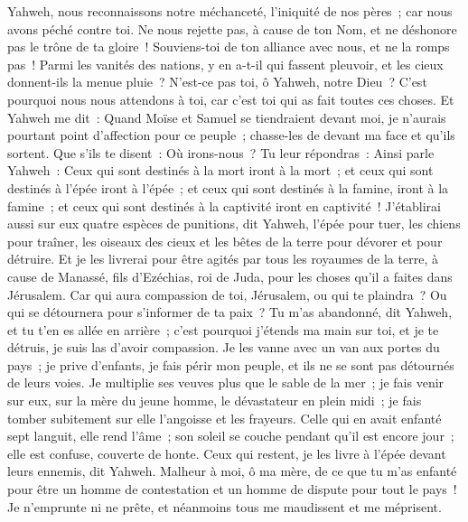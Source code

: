 \begin{multicols}{2}
Yahweh, nous reconnaissons notre méchanceté, l'iniquité de nos pères~; car nous avons péché contre toi.
Ne nous rejette pas, à cause de ton Nom, et ne déshonore pas le trône de ta gloire~! Souviens-toi de ton alliance avec nous, et ne la romps pas~!
Parmi les vanités des nations, y en a-t-il qui fassent pleuvoir, et les cieux donnent-ils la menue pluie~? N'est-ce pas toi, ô Yahweh, notre Dieu~? C'est pourquoi nous nous attendons à toi, car c'est toi qui as fait toutes ces choses.
\VerseOne{}Et Yahweh me dit~: Quand Moïse et Samuel se tiendraient devant moi, je n'aurais pourtant point d'affection pour ce peuple~; chasse-les de devant ma face et qu'ils sortent.
Que s'ils te disent~: Où irons-nous~? Tu leur répondras~: Ainsi parle Yahweh~: Ceux qui sont destinés à la mort iront à la mort~; et ceux qui sont destinés à l'épée iront à l'épée~; et ceux qui sont destinés à la famine, iront à la famine~; et ceux qui sont destinés à la captivité iront en captivité~!
J'établirai aussi sur eux quatre espèces de punitions, dit Yahweh, l'épée pour tuer, les chiens pour traîner, les oiseaux des cieux et les bêtes de la terre pour dévorer et pour détruire. 
Et je les livrerai pour être agités par tous les royaumes de la terre, à cause de Manassé, fils d'Ezéchias, roi de Juda, pour les choses qu'il a faites dans Jérusalem. 
Car qui aura compassion de toi, Jérusalem, ou qui te plaindra~? Ou qui se détournera pour s'informer de ta paix~? 
Tu m'as abandonné, dit Yahweh, et tu t'en es allée en arrière~; c'est pourquoi j'étends ma main sur toi, et je te détruis, je suis las d'avoir compassion.
Je les vanne avec un van aux portes du pays~; je prive d'enfants, je fais périr mon peuple, et ils ne se sont pas détournés de leurs voies.
Je multiplie ses veuves plus que le sable de la mer~; je fais venir sur eux, sur la mère du jeune homme, le dévastateur en plein midi~; je fais tomber subitement sur elle l'angoisse et les frayeurs.
Celle qui en avait enfanté sept languit, elle rend l'âme~; son soleil se couche pendant qu'il est encore jour~; elle est confuse, couverte de honte. Ceux qui restent, je les livre à l'épée devant leurs ennemis, dit Yahweh.
Malheur à moi, ô ma mère, de ce que tu m'as enfanté pour être un homme de contestation et un homme de dispute pour tout le pays~! Je n'emprunte ni ne prête, et néanmoins tous me maudissent et me méprisent.

\end{multicols}
